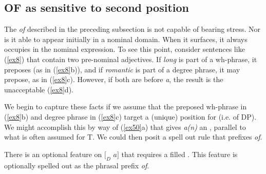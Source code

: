 \documentclass[output=paper,
modfonts
]{LSP/langsci}
\begin{document}
\subsection{OF as sensitive to second position}
The {\textit{of}} described in the preceding subsection is not capable of bearing stress.  Nor is it able to appear initially in a nominal domain.  When it surfaces, it always occupies  in the nominal expression.  To see this point, consider sentences like ({\ref{ex8}}) that contain two pre-nominal adjectives.  If {\textit{long}} is part of a wh-phrase, it preposes (as in ({\ref{ex8}}b)), and if {\textit{romantic}} is part of a degree phrase, it may prepose, as in ({\ref{ex8}}c).  However, if both are before {\textit{a}}, the result is the unacceptable ({\ref{ex8}}d).

\begin{exe}
\ex\label{ex8}
\begin{xlist}
\end{xlist}
\end{exe}
We begin to capture these facts if we assume that the preposed wh-phrase in ({\ref{ex8}}b) and degree phrase in ({\ref{ex8}}c) target a (unique)  position for  (i.e.  of DP).  We might accomplish this by way of ({\ref{ex50}}a) that gives {\textit{a(n)}} an , parallel to what is often assumed for T.  We could then posit a spell out rule that prefixes {\textit{of}}.
\begin{exe}  
\ex\label{ex50}
\begin{xlist}
\ex  There is an optional feature on $[_{D}$ $a ]$ that requires a filled .  
\ex  This feature is optionally spelled out as the phrasal prefix {\textit{of}}.
\end{xlist}
\end{exe}
\end{document}
